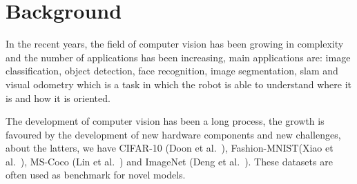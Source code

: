 
\section{Background}\label{sec:background}

In the recent years, the field of computer vision has been growing in complexity and the number of applications has been increasing, main applications are: image classification, object detection, face recognition, image segmentation, \gls{slam} and visual odometry which is a task in which the robot is able to understand where it is and how it is oriented.

The development of computer vision has been a long process, the growth is favoured by the development of new hardware components and new challenges, about the latters, we have
CIFAR-10 (Doon et al.~\cite{cifar10_paper}), Fashion-MNIST(Xiao et al.~\cite{fashion_mnist_paper}), MS-Coco (Lin et al.~\cite{ms_coco_paper}) and ImageNet (Deng et al.~\cite{imagenet_paper}).
These datasets are often used as benchmark for novel models.

